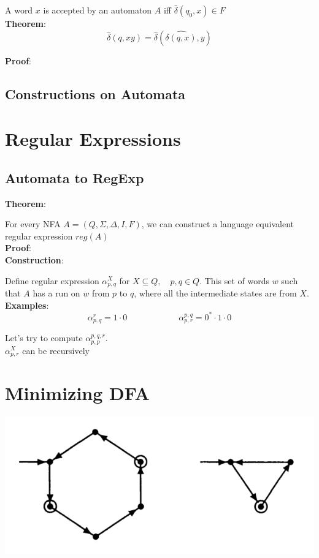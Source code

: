 \documentclass{report}
\begin{document}
A word $x$ is accepted by an automaton $A$ iff $\hat{\delta}(q_0,x) \in F$ \\

\textbf{Theorem}: $$\hat{\delta}(q,xy) = \hat{\delta}(\hat{\delta(q,x)},y)$$

\textbf{Proof}:

\section{Constructions on Automata}



\chapter{Regular Expressions}
\section{Automata to RegExp}

\textbf{Theorem}:

For every NFA $A = (Q,\Sigma,\Delta,I,F)$, we can construct a language equivalent regular expression $reg(A)$ \\

\textbf{Proof}: \\

\textbf{Construction}:

Define regular expression $\alpha_{p,q}^{X}$ for $X \subseteq Q, \quad p,q \in Q$. This set of words $w$ such that $A$ has a run on $w$ from $p$ to $q$, where all the intermediate states are from $X$. \\

\textbf{Examples}:
$$
  \alpha_{p,q}^{r} = 1 \cdot 0 \qquad \qquad \qquad \alpha_{p,r}^{p,q} = 0^* \cdot 1 \cdot 0
$$

Let's try to compute $\alpha_{p,p}^{p,q,r}$. \\

$\alpha_{p,r}^X$ can be recursively


\chapter{Minimizing DFA}

\begin{center}
  \includegraphics[scale=0.5]{images/mul_dfa.png}
\end{center}
\end{document}

